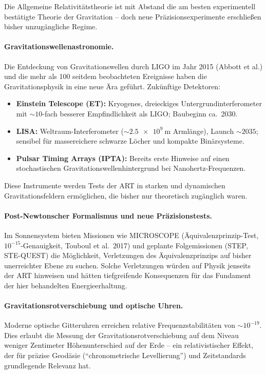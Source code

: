 ﻿\documentclass[12pt, a4paper]{report}
\theoremstyle{definition}
\theoremstyle{remark}
\begin{document}
Die Allgemeine Relativitätstheorie ist mit Abstand die am besten experimentell
bestätigte Theorie der Gravitation -- doch neue Präzisionsexperimente erschließen
bisher unzugängliche Regime.

\paragraph{Gravitationswellenastronomie.}
Die Entdeckung von Gravitationswellen durch LIGO im Jahr 2015 (Abbott et al.)
und die mehr als 100 seitdem beobachteten Ereignisse haben die Gravitationsphysik
in eine neue Ära geführt. Zukünftige Detektoren:
\begin{itemize}
  \item \textbf{Einstein Telescope (ET):} Kryogenes, dreieckiges Untergrundinterferometer
        mit $\sim 10$-fach besserer Empfindlichkeit als LIGO; Baubeginn ca.\ 2030.
  \item \textbf{LISA:} Weltraum-Interferometer ($\sim \SI{2.5e9}{\metre}$ Armlänge),
        Launch $\sim 2035$; sensibel für massereichere schwarze Löcher und
        kompakte Binärsysteme.
  \item \textbf{Pulsar Timing Arrays (IPTA):} Bereits erste Hinweise auf einen
        stochastischen Gravitationswellenhintergrund bei Nanohertz-Frequenzen.
\end{itemize}
Diese Instrumente werden Tests der ART in starken und dynamischen Gravitationsfeldern
ermöglichen, die bisher nur theoretisch zugänglich waren.

\paragraph{Post-Newtonscher Formalismus und neue Präzisionstests.}
Im Sonnensystem bieten Missionen wie MICROSCOPE (Äquivalenzprinzip-Test,
$10^{-15}$-Genauigkeit, Touboul et al.\ 2017) und geplante Folgemissionen
(STEP, STE-QUEST) die Möglichkeit, Verletzungen des Äquivalenzprinzips auf
bisher unerreichter Ebene zu suchen. Solche Verletzungen würden auf Physik
jenseits der ART hinweisen und hätten tiefgreifende Konsequenzen für das
Fundament der hier behandelten Energieerhaltung.

\paragraph{Gravitationsrotverschiebung und optische Uhren.}
Moderne optische Gitteruhren erreichen relative Frequenzstabilitäten von
$\sim 10^{-19}$. Dies erlaubt die Messung der Gravitationsrotverschiebung
auf dem Niveau weniger Zentimeter Höhenunterschied auf der Erde -- ein
relativistischer Effekt, der für präzise Geodäsie (``chronometrische
Levellierung'') und Zeitstandards grundlegende Relevanz hat.
\end{document}
